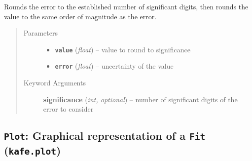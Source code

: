 \documentclass[a4paper,10pt,english]{sphinxmanual}
\begin{document}

\begin{fulllineitems}
\label{module_doc:kafe.fit.round_to_significance}
Rounds the error to the established number of significant digits, then
rounds the value to the same order of magnitude as the error.
\begin{quote}\begin{description}
\item[{Parameters}] \leavevmode\begin{itemize}
\item {} 
\textbf{\texttt{value}} (\emph{float}) -- value to round to significance

\item {} 
\textbf{\texttt{error}} (\emph{float}) -- uncertainty of the value

\end{itemize}

\item[{Keyword Arguments}] \leavevmode
\textbf{significance} (\emph{int, optional}) --
number of significant digits of the error to consider

\end{description}\end{quote}

\end{fulllineitems}



\subsection{\texttt{Plot}: Graphical representation of a \texttt{Fit} (\texttt{kafe.plot})}
\label{module_doc:module-kafe.plot}\label{module_doc:plot-graphical-representation-of-a-fit-kafe-plot}\label{module_doc:module-plot}
\end{document}
